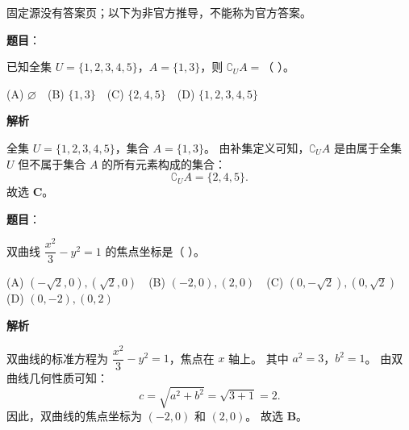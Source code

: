 
\begin{gktip}
固定源没有答案页；以下为非官方推导，不能称为官方答案。
\end{gktip}


\begin{answer}

\textbf{题目}：

已知全集 $U = \{1, 2, 3, 4, 5\}$，$A = \{1, 3\}$，则 $\complement_U A =$（ ）。

(A) $\varnothing$　(B) $\{1, 3\}$　(C) $\{2, 4, 5\}$　(D) $\{1, 2, 3, 4, 5\}$

\textbf{解析}

全集 $U = \{1, 2, 3, 4, 5\}$，集合 $A = \{1, 3\}$。
由补集定义可知，$\complement_U A$ 是由属于全集 $U$ 但不属于集合 $A$ 的所有元素构成的集合：
\nopagebreak[4]
\[\complement_U A = \{2, 4, 5\}.\]
故选 \textbf{C}。


\end{answer}
\begin{answer}

\textbf{题目}：

双曲线 $\dfrac{x^2}{3} - y^2 = 1$ 的焦点坐标是（ ）。

(A) $(-\sqrt2, 0), (\sqrt2, 0)$　(B) $(-2, 0), (2, 0)$　(C) $(0, -\sqrt2), (0, \sqrt2)$　(D) $(0, -2), (0, 2)$

\textbf{解析}

双曲线的标准方程为 $\dfrac{x^2}{3} - y^2 = 1$，焦点在 $x$ 轴上。
其中 $a^2 = 3$，$b^2 = 1$。
由双曲线几何性质可知：
\nopagebreak[4]
\[c = \sqrt{a^2 + b^2} = \sqrt{3 + 1} = 2.\]
因此，双曲线的焦点坐标为 $(-2, 0)$ 和 $(2, 0)$。
故选 \textbf{B}。


\end{answer}
